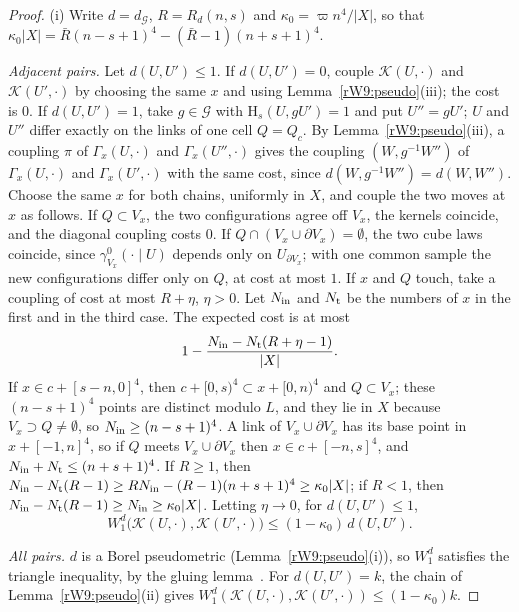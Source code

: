 \begin{proof}
(i) Write $d=d_{\mathcal G}$, $R=R_d(n,s)$ and $\kappa_0=\varpi n^4/\lvert X
\rvert$, so that $\kappa_0\lvert X\rvert=\bar R(n-s+1)^4-(\bar R-1)(n+s+1)^4$.

\emph{Adjacent pairs.} Let $d(U,U')\le1$. If $d(U,U')=0$, couple $\mathcal K(U,
\cdot)$ and $\mathcal K(U',\cdot)$ by choosing the same $x$ and using
Lemma~\ref{rW9:pseudo}(iii); the cost is $0$. If $d(U,U')=1$, take $g\in
\mathcal G$ with $\mathrm H_s(U,gU')=1$ and put $U''=gU'$; $U$ and $U''$ differ
exactly on the links of one cell $Q=Q_c$. By Lemma~\ref{rW9:pseudo}(iii), a
coupling $\pi$ of $\Gamma_x(U,\cdot)$ and $\Gamma_x(U'',\cdot)$ gives the
coupling $(W,g^{-1}W'')$ of $\Gamma_x(U,\cdot)$ and $\Gamma_x(U',\cdot)$ with
the same cost, since $d(W,g^{-1}W'')=d(W,W'')$. Choose the same $x$ for both
chains, uniformly in $X$, and couple the two moves at $x$ as follows. If $Q
\subset V_x$, the two configurations agree off $V_x$, the kernels coincide,
and the diagonal coupling costs $0$. If $Q\cap(V_x\cup\partial V_x)=
\emptyset$, the two cube laws coincide, since $\gamma^0_{V_x}(\cdot\mid U)$
depends only on $U_{\partial V_x}$; with one common sample the new
configurations differ only on $Q$, at cost at most $1$. If $x$ and $Q$ touch,
take a coupling of cost at most $R+\eta$, $\eta>0$. Let $N_{\rm in}$ and
$N_{\rm t}$ be the numbers of $x$ in the first and in the third case. The
expected cost is at most
\[
1-\frac{N_{\rm in}-N_{\rm t}(R+\eta-1)}{\lvert X\rvert}.
\]
If $x\in c+[s-n,0]^4$, then $c+[0,s)^4\subset x+[0,n)^4$ and $Q\subset
V_x$; these $(n-s+1)^4$ points are distinct modulo $L$, and they lie in $X$
because $V_x\supset Q\ne\emptyset$, so $N_{\rm in}\ge(n-s+1)^4$. A link of
$V_x\cup\partial V_x$ has its base point in $x+[-1,n]^4$, so if $Q$ meets
$V_x\cup\partial V_x$ then $x\in c+[-n,s]^4$, and $N_{\rm in}+N_{\rm t}\le
(n+s+1)^4$. If $R\ge1$, then $N_{\rm in}-N_{\rm t}(R-1)\ge RN_{\rm in}-(R-1)
(n+s+1)^4\ge\kappa_0\lvert X\rvert$; if $R<1$, then $N_{\rm in}-N_{\rm t}(R-1)
\ge N_{\rm in}\ge\kappa_0\lvert X\rvert$. Letting $\eta\to0$, for $d(U,U')\le1$,
\[
W_1^d\bigl(\mathcal K(U,\cdot),\mathcal K(U',\cdot)\bigr)\le(1-\kappa_0)\,
d(U,U').
\]

\emph{All pairs.} $d$ is a Borel pseudometric (Lemma~\ref{rW9:pseudo}(i)), so
$W_1^d$ satisfies the triangle inequality, by the gluing
lemma~\cite[Ch.~1]{Vil09}. For $d(U,U')=k$, the chain of
Lemma~\ref{rW9:pseudo}(ii) gives $W_1^d(\mathcal K(U,\cdot),\mathcal K(U',
\cdot))\le(1-\kappa_0)k$.


\end{proof}

